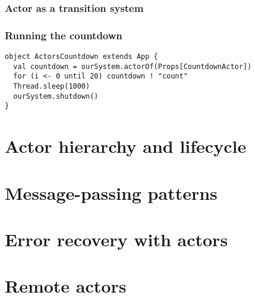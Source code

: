 \documentclass[aspectratio=169]{beamer}
\begin{document}
\begin{frame}\frametitle{Actor as a transition system}
  \centering
\end{frame}

\begin{frame}[fragile]\frametitle{Running the countdown}

\begin{lstlisting}[emph={Actor, Logging, Props, ourSystem,shutdown,sleep,actorOf,receive,become}]
object ActorsCountdown extends App {
  val countdown = ourSystem.actorOf(Props[CountdownActor])
  for (i <- 0 until 20) countdown ! "count"
  Thread.sleep(1000)
  ourSystem.shutdown()
}
\end{lstlisting}


\end{frame}

\section{Actor hierarchy and lifecycle}


\section{Message-passing patterns}


\section{Error recovery with actors}


\section{Remote actors}
\end{document}
